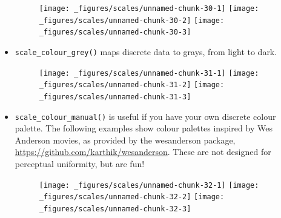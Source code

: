 \begin{itemize}
  \begin{figure}[H]
    \texttt{[image: \_figures/scales/unnamed-chunk-30-1]}%
    \texttt{[image: \_figures/scales/unnamed-chunk-30-2]}%
    \texttt{[image: \_figures/scales/unnamed-chunk-30-3]}
  \end{figure}
\item
  \texttt{scale\_colour\_grey()} maps discrete data to grays, from light
  to dark.  

\begin{Shaded}
\begin{Highlighting}[]
\StringTok{ }\NormalTok{()}
\StringTok{ }\NormalTok{(} \NormalTok{, } \NormalTok{)}
\StringTok{ }\NormalTok{(} \NormalTok{, } \NormalTok{)}
\end{Highlighting}
\end{Shaded}

  \begin{figure}[H]
    \texttt{[image: \_figures/scales/unnamed-chunk-31-1]}%
    \texttt{[image: \_figures/scales/unnamed-chunk-31-2]}%
    \texttt{[image: \_figures/scales/unnamed-chunk-31-3]}
  \end{figure}
\item
  \texttt{scale\_colour\_manual()} is useful if you have your own
  discrete colour palette. The following examples show colour palettes
  inspired by Wes Anderson movies, as provided by the wesanderson
  package, \url{https://github.com/karthik/wesanderson}. These are not
  designed for perceptual uniformity, but are fun!
   

\begin{Shaded}
\begin{Highlighting}[]
\StringTok{ }\NormalTok{(} \NormalTok{(}\NormalTok{))}
\StringTok{ }\NormalTok{(} \NormalTok{(}\NormalTok{))}
\StringTok{ }\NormalTok{(} \NormalTok{(}\NormalTok{))}
\end{Highlighting}
\end{Shaded}

  \begin{figure}[H]
    \texttt{[image: \_figures/scales/unnamed-chunk-32-1]}%
    \texttt{[image: \_figures/scales/unnamed-chunk-32-2]}%
    \texttt{[image: \_figures/scales/unnamed-chunk-32-3]}
  \end{figure}
\end{itemize}

